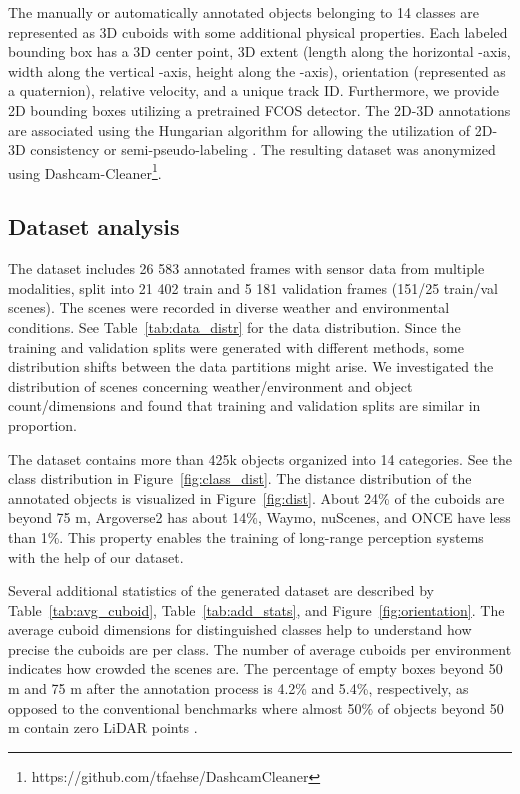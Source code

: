\documentclass{article}
\begin{document}
The manually or automatically annotated objects belonging to 14 classes are represented as 3D cuboids with some additional physical properties. Each labeled bounding box has a 3D center point, 3D extent (length along the horizontal -axis, width along the vertical -axis, height along the -axis), orientation (represented as a quaternion), relative velocity, and a unique track ID. Furthermore, we provide 2D bounding boxes utilizing a pretrained FCOS \citep{tian2019fcos} detector. The 2D-3D annotations are associated using the Hungarian algorithm \citep{kuhn1955hungarian} for allowing the utilization of 2D-3D consistency or semi-pseudo-labeling \citep{matuszka2022novel}. The resulting dataset was anonymized using Dashcam-Cleaner\footnote{https://github.com/tfaehse/DashcamCleaner}.

\subsection{Dataset analysis}
The dataset includes 26 583 annotated frames with sensor data from multiple modalities, split into 21 402 train and 5 181 validation frames (151/25 train/val scenes). The scenes were recorded in diverse weather and environmental conditions. See Table~\ref{tab:data_distr} for the data distribution. Since the training and validation splits were generated with different methods, some distribution shifts between the data partitions might arise. We investigated the distribution of scenes concerning weather/environment and object count/dimensions and found that training and validation splits are similar in proportion.

The dataset contains more than 425k objects organized into 14 categories. See the class distribution in Figure~\ref{fig:class_dist}. The distance distribution of the annotated objects is visualized in Figure~\ref{fig:dist}. About 24\% of the cuboids are beyond 75 m, Argoverse2 has about 14\%, Waymo, nuScenes, and ONCE have less than 1\%. This property enables the training of long-range perception systems with the help of our dataset. 

Several additional statistics of the generated dataset are described by Table~\ref{tab:avg_cuboid}, Table~\ref{tab:add_stats}, and Figure~\ref{fig:orientation}. The average cuboid dimensions for distinguished classes help to understand how precise the cuboids are per class. The number of average cuboids per environment indicates how crowded the scenes are. The percentage of empty boxes beyond 50 m and 75 m after the annotation process is 4.2\% and 5.4\%, respectively, as opposed to the conventional benchmarks where almost 50\% of objects beyond 50 m contain zero LiDAR points \citep{gupta2023far3det}. 
\end{document}

